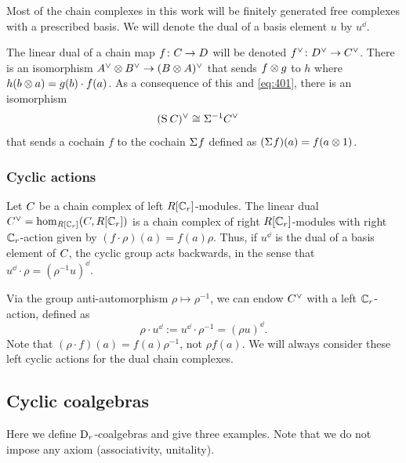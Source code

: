Most of the chain complexes in this work will be finitely generated free complexes with a prescribed basis. We will denote the dual of a basis element $u$ by $u^\dd$. 


The linear dual of a chain map $f\colon C_{} \to D$ will be denoted $f^{\vee}\colon D^\vee\to C^\vee_{}$.  
There is an isomorphism $A^\vee \otimes B^\vee \to (B \otimes A)^{\vee}$ that sends $f \otimes g$ to $h$ where $h(b \otimes a) = g(b)\cdot f(a)$. As a consequence of this and \eqref{eq:401}, there is an isomorphism
\begin{align*}
	(\operatorname{S}^{}C_{} )^\vee &\cong \Sigma^{-1}C^\vee_{}
\end{align*}
that sends a cochain $f$ to the cochain $\Sigma^{}f$ defined as $(\Sigma^{}f)(a) = f(a\otimes 1)$.

\subsubsection{Cyclic actions}

Let $C_{}$ be a chain complex of left $R[\mathbb{C}_r]$-modules. The linear dual $C^\vee_{}=\hom_{R[\mathbb{C}_r]}(C, R[\mathbb{C}_r])$ is a chain complex of right $R[\mathbb{C}_r]$-modules with right $\mathbb{C}_r$-action given by $ (f\cdot \rho)(a)=f(a)\rho$. Thus, if $u^\dd$ is the dual of a basis element of $C_{}$, the cyclic group acts backwards, in the sense that $u^\dd\cdot \rho=(\rho^{-1}u)^\dd$.

Via the group anti-automorphism $\rho\mapsto\rho^{-1}$, we can endow $C^\vee_{}$ with a left $\mathbb{C}_r$-action, defined as 
\[
\rho\cdot u^\dd:=u^\dd\cdot \rho^{-1}=(\rho u)^\dd.
\] Note that $(\rho\cdot f)(a)=f(a)\rho^{-1}$, not $\rho f(a)$. We will always consider these left cyclic actions for the dual chain complexes.


\subsection{Cyclic coalgebras}\label{s:categories} Here we define $\mathrm{D}_r$-coalgebras and give three examples. Note that we do not impose any axiom (associativity, unitality).

